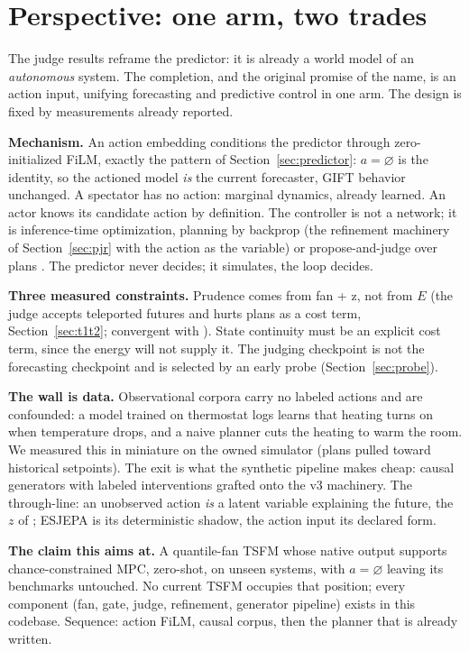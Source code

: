 \section{Perspective: one arm, two trades}
\label{sec:worldmodel}

The judge results reframe the predictor: it is already a world model of an
\emph{autonomous} system. The completion, and the original promise of the
name, is an action input, unifying forecasting and predictive control in
one arm. The design is fixed by measurements already reported.

\textbf{Mechanism.} An action embedding conditions the predictor through
zero-initialized FiLM, exactly the pattern of
Section~\ref{sec:predictor}: $a = \varnothing$ is the identity, so the
actioned model \emph{is} the current forecaster, GIFT behavior unchanged. A
spectator has no action: marginal dynamics, already learned. An actor knows
its candidate action by definition. The controller is not a network; it is
inference-time optimization, planning by backprop (the refinement machinery
of Section~\ref{sec:pjr} with the action as the variable) or
propose-and-judge over plans \citep{williams2017mppi,hansen2024tdmpc2}. The
predictor never decides; it simulates, the loop decides.

\textbf{Three measured constraints.} Prudence comes from fan + z, not from
$E$ (the judge accepts teleported futures and hurts plans as a cost term,
Section~\ref{sec:t1t2}; convergent with \citet{henaff2019mpur}). State
continuity must be an explicit cost term, since the energy will not supply
it. The judging checkpoint is not the forecasting checkpoint and is
selected by an early probe (Section~\ref{sec:probe}).

\textbf{The wall is data.} Observational corpora carry no labeled actions
and are confounded: a model trained on thermostat logs learns that heating
turns on when temperature drops, and a naive planner cuts the heating to
warm the room. We measured this in miniature on the owned simulator (plans
pulled toward historical setpoints). The exit is what the synthetic
pipeline makes cheap: causal generators with labeled interventions
\citep{cauker2025} grafted onto the v3 machinery. The through-line: an
unobserved action \emph{is} a latent variable explaining the future, the
$z$ of \citet{lecun2022path}; ESJEPA is its deterministic shadow, the
action input its declared form.

\textbf{The claim this aims at.} A quantile-fan TSFM whose native output
supports chance-constrained MPC, zero-shot, on unseen systems, with
$a=\varnothing$ leaving its benchmarks untouched. No current TSFM occupies
that position; every component (fan, gate, judge, refinement, generator
pipeline) exists in this codebase. Sequence: action FiLM, causal corpus,
then the planner that is already written.
